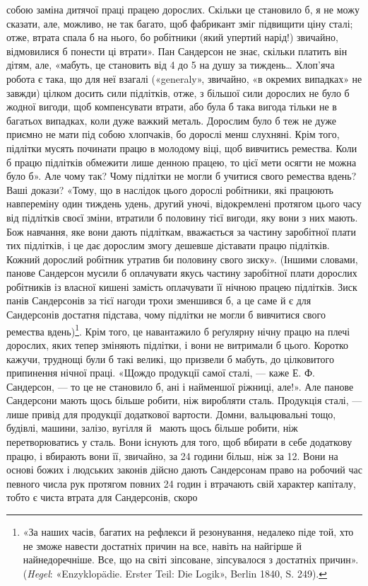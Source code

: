 \parcont{}  %
собою заміна дитячої праці працею дорослих. Скільки це становило
б, я не можу сказати, але, можливо, не так багато, щоб фабрикант
зміг підвищити ціну сталі; отже, втрата спала б на нього,
бо робітники (який упертий нарід!) звичайно, відмовилися б
понести ці втрати». Пан Сандерсон не знає, скільки платить він
дітям, але, «мабуть, це становить від 4 до 5 на душу за
тиждень\dots{} Хлоп’яча робота є така, що для неї взагалі («generaly»,
звичайно, «в окремих випадках» не завжди) цілком досить
сили підлітків, отже, з більшої сили дорослих не було б жодної
вигоди, щоб компенсувати втрати, або була б така вигода тільки
не в багатьох випадках, коли дуже важкий металь. Дорослим
було б теж не дуже приємно не мати під собою хлопчаків, бо дорослі
менш слухняні. Крім того, підлітки мусять починати працю
в молодому віці, щоб вивчитись ремества. Коли б працю підлітків
обмежити лише денною працею, то цієї мети осягти не можна
було б». Але чому так? Чому підлітки не могли б учитися свого
ремества вдень? Ваші докази? «Тому, що в наслідок цього дорослі
робітники, які працюють навпереміну один тиждень удень,
другий уночі, відокремлені протягом цього часу від підлітків
своєї зміни, втратили б половину тієї вигоди, яку вони з них
мають. Бож навчання, яке вони дають підліткам, вважається за
частину заробітної плати тих підлітків, і це дає дорослим змогу
дешевше діставати працю підлітків. Кожний дорослий робітник
утратив би половину свого зиску». (Іншими словами, панове
Сандерсон мусили б оплачувати якусь частину заробітної плати
дорослих робітників із власної кишені замість оплачувати її
нічною працею підлітків. Зиск панів Сандерсонів за тієї нагоди
трохи зменшився б, а це саме й є для Сандерсонів достатня підстава,
чому підлітки не могли б вивчитися свого ремества вдень)\footnote{
«За наших часів, багатих на рефлекси й резонування, недалеко
піде той, хто не зможе навести достатніх причин на все, навіть на найгірше
й найнедоречніше. Все, що на світі зіпсоване, зіпсувалося з достатніх
причин». (\emph{Hegel}: «Enzyklopädie. Erster Teil: Die Logik», Berlin
1840, S. 249).
}.
Крім того, це навантажило б реґулярну нічну працю на плечі
дорослих, яких тепер зміняють підлітки, і вони не витримали б
цього. Коротко кажучи, труднощі були б такі великі, що призвели б
мабуть, до цілковитого припинення нічної праці. «Щождо продукції
самої сталі, — каже Е. Ф. Сандерсон, — то це не становило б,
ані і найменшої ріжниці, але!». Але панове Сандерсони мають
щось більше робити, ніж виробляти сталь. Продукція сталі, —
лише привід для продукції додаткової вартости. Домни, вальцювальні
тощо, будівлі, машини, залізо, вугілля й~ мають
щось більше робити, ніж перетворюватись у сталь. Вони існують
для того, щоб вбирати в себе додаткову працю, і вбирають вони
її, звичайно, за 24 години більш, ніж за 12. Вони на основі божих
і людських законів дійсно дають Сандерсонам право на робочий
час певного числа рук протягом повних 24 годин і втрачають свій
характер капіталу, тобто є чиста втрата для Сандерсонів, скоро
\parbreak{}  %

